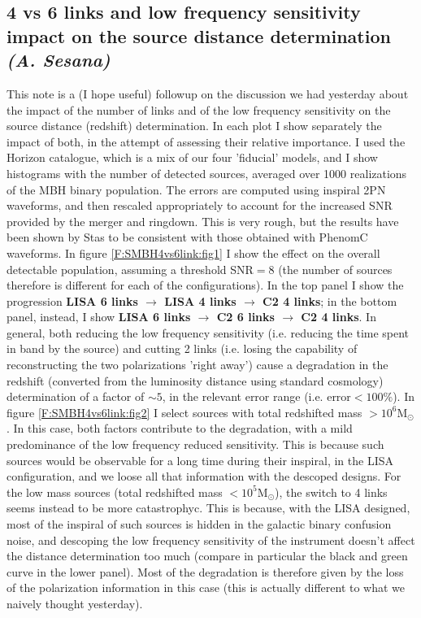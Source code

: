 \documentclass{iopart}
\begin{document}
\subsection{4 vs 6 links and low frequency sensitivity impact on the source distance determination {\it (A. Sesana)} }
\label{SS:SMBH4vs6link}


This note is a (I hope useful) followup on the discussion we had yesterday about the impact of the number of links and of the low frequency sensitivity on the source distance (redshift) determination. In each plot I show separately the impact of both, in the attempt of assessing their relative importance. I used the Horizon catalogue, which is a mix of our four 'fiducial' models, and I show histograms with the number of detected sources, averaged over 1000 realizations of the MBH binary population. The errors are computed using inspiral 2PN waveforms, and then rescaled appropriately to account for the increased SNR provided by the merger and ringdown. This is very rough, but the results have been shown by Stas to be consistent with those obtained with PhenomC waveforms. In figure \ref{F:SMBH4vs6link:fig1} I show the effect on the overall detectable population, assuming a threshold SNR$=8$ (the number of sources therefore is different for each of the configurations). In the top panel I show the progression {\bf LISA 6 links $\rightarrow$ LISA 4 links $\rightarrow$ C2 4 links}; in the bottom panel, instead, I show {\bf LISA 6 links $\rightarrow$ C2 6 links $\rightarrow$ C2 4 links}. In general, both reducing the low frequency sensitivity (i.e. reducing the time spent in band by the source) and cutting 2 links (i.e. losing the capability of reconstructing the two polarizations 'right away') cause a degradation in the redshift (converted from the luminosity distance using standard cosmology) determination of a factor of $\sim5$, in the relevant error range (i.e. error$<100\%$). In figure \ref{F:SMBH4vs6link:fig2} I select sources with total redshifted mass $>10^6$M$_\odot$. In this case, both factors contribute to the degradation, with a mild predominance of the low frequency reduced sensitivity. This is because such sources would be observable for a long time during their inspiral, in the LISA configuration, and we loose all that information with the descoped designs. For the low mass sources (total redshifted mass $<10^5$M$_\odot$), the switch to 4 links seems instead to be more catastrophyc. This is because, with the LISA designed, most of the inspiral of such sources is hidden in the galactic binary confusion noise, and descoping the low frequency sensitivity of the instrument doesn't affect the distance determination too much (compare in particular the black and green curve in the lower panel). Most of the degradation is therefore given by the loss of the polarization information in this case (this is actually different to what we naively thought yesterday).
\end{document}
